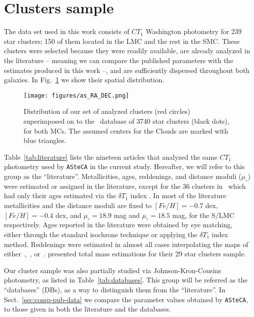 \documentclass[draft]{aa}
\begin{document}

\section{Clusters sample}
\label{sec:clust-sample}

The data set used in this work consists of $CT_1$ Washington photometry for 239
star clusters; 150 of them located in the LMC and the rest in the SMC.\@
%
These clusters were selected because they were readily available, are
already analyzed in the literature -- meaning we can compare the published
parameters with the estimates produced in this work --, and are sufficiently
dispersed throughout both galaxies. In Fig.~\ref{fig:ra-dec} we show their
spatial distribution.

\begin{figure}
\centering
\texttt{[image: figures/as\_RA\_DEC.png]}
\caption{Distribution of our set of analyzed clusters (red circles)
superimposed on to the~\cite{Bica_2008} database of 3740 star clusters (black
dots), for both MCs. The assumed centers for the Clouds are marked with blue
triangles.}
\label{fig:ra-dec}
\end{figure}

Table~\ref{tab:literature} lists the nineteen articles that analyzed the same
$CT_1$ photometry used by \texttt{ASteCA} in the current study. Hereafter, we
will refer to this group as the ``literature''.
%
Metallicities, ages, reddenings, and distance moduli ($\mu_{\circ}$)
were estimated or assigned in the literature, except for the 36
clusters in~\cite{Piatti_2011b} which had only their ages estimated
via the $\delta T_1$ index \citep{Phelps_1994,Geisler_1997}.
%
In most of the literature metallicities and the distance moduli are fixed to
$[Fe/H]{=}-0.7$ dex, $[Fe/H]{=}-0.4$ dex, and $\mu_{\circ}{=}18.9$ mag and
$\mu_{\circ}{=}18.5$ mag, for the S/LMC respectively.
Ages reported in the literature were obtained by eye matching, either through
the standard isochrone technique or applying the $\delta T_1$ index method.
Reddenings were estimated in almost all cases interpolating the maps
of either~\cite{Burstein_1982},~\cite{Schlegel_1998}, or~\cite{Haschke_2011}.
\cite{Maia_2013} presented total mass estimations for their 29 star clusters
sample.

Our cluster sample was also partially studied via Johnson-Kron-Cousins
photometry, as listed in Table~\ref{tab:databases}. This group will be referred
as the ``databases'' (DBs), as a way to distinguish them from the
``literature''. In Sect.~\ref{sec:comp-pub-data} we compare the parameter
values obtained by \texttt{ASteCA}, to those given in both the literature and
the databases.
\end{document}
